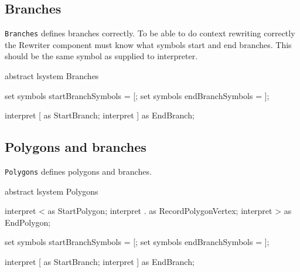 

\subsection{Branches}

\lsystem \texttt{Branches} defines branches correctly.
To be able to do context rewriting correctly the Rewriter component must know what symbols start and end branches.
This should be the same symbol as supplied to interpreter.

\begin{LsystemBreak}
abstract lsystem Branches {
	set symbols startBranchSymbols = [;
	set symbols endBranchSymbols = ];

	interpret [ as StartBranch;
	interpret ] as EndBranch;
}
\end{LsystemBreak}


\subsection{Polygons and branches}

\lsystem \texttt{Polygons} defines polygons and branches.

\begin{LsystemBreak}
abstract lsystem Polygons {
	interpret < as StartPolygon;
	interpret . as RecordPolygonVertex;
	interpret > as EndPolygon;

	set symbols startBranchSymbols = [;
	set symbols endBranchSymbols = ];

	interpret [ as StartBranch;
	interpret ] as EndBranch;
}
\end{LsystemBreak}


